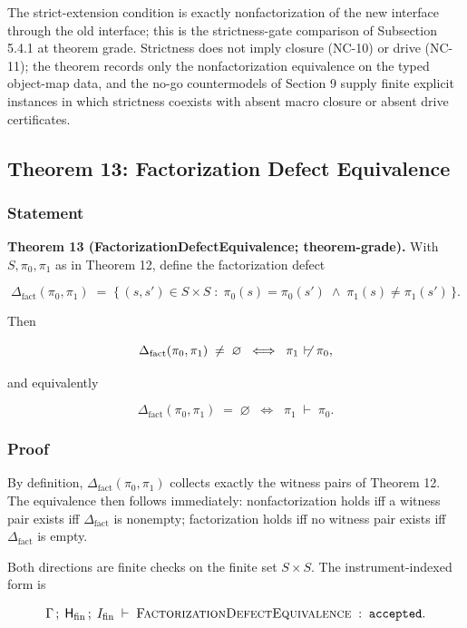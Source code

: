 \documentclass[11pt]{article}
\providecommand{\factor}{\mathrel{\!\vdash\!}}
\theoremstyle{definition}
\begin{document}
The strict-extension condition is exactly nonfactorization of the new interface through the old interface; this is the strictness-gate comparison of Subsection 5.4.1 at theorem grade. Strictness does not imply closure (NC-10) or drive (NC-11); the theorem records only the nonfactorization equivalence on the typed object-map data, and the no-go countermodels of Section 9 supply finite explicit instances in which strictness coexists with absent macro closure or absent drive certificates.

\subsection{Theorem 13: Factorization Defect Equivalence}

\subsubsection{Statement}

\textbf{Theorem 13 (FactorizationDefectEquivalence; theorem-grade).} With \(S,\pi_0,\pi_1\) as in Theorem 12, define the factorization defect

\[
\Delta_{\mathrm{fact}}(\pi_0,\pi_1)\;=\;\{\,(s,s')\in S\times S\;:\;\pi_0(s)=\pi_0(s')\;\wedge\;\pi_1(s)\neq\pi_1(s')\,\}.
\]

Then

\[
\Delta_{\mathrm{fact}}(\pi_0,\pi_1)\;\neq\;\varnothing\;\;\Longleftrightarrow\;\;\pi_1\;\not\factor\;\pi_0,
\]

and equivalently

\[
\Delta_{\mathrm{fact}}(\pi_0,\pi_1)\;=\;\varnothing\;\;\Longleftrightarrow\;\;\pi_1\;\factor\;\pi_0.
\]

\subsubsection{Proof}

By definition, \(\Delta_{\mathrm{fact}}(\pi_0,\pi_1)\) collects exactly the witness pairs of Theorem 12. The equivalence then follows immediately: nonfactorization holds iff a witness pair exists iff \(\Delta_{\mathrm{fact}}\) is nonempty; factorization holds iff no witness pair exists iff \(\Delta_{\mathrm{fact}}\) is empty.

Both directions are finite checks on the finite set \(S\times S\). The instrument-indexed form is

\[
\Gamma\,;\;\mathsf H_{\mathrm{fin}}\,;\;I_{\mathrm{fin}}\;\vdash\;\textsc{FactorizationDefectEquivalence}\;:\;\texttt{accepted}.
\]
\end{document}
